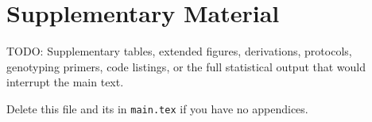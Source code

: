 \chapter{Supplementary Material}\label{appendix:supplementary}
\thispagestyle{myheadings}


	TODO: Supplementary tables, extended figures, derivations, protocols,
	genotyping primers, code listings, or the full statistical output that
	would interrupt the main text.

	Delete this file and its \verb|| in \texttt{main.tex} if you have no
	appendices.
